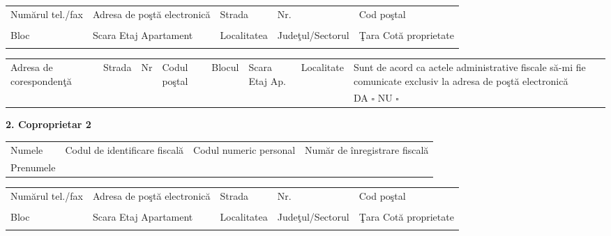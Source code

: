 \documentclass[10pt,a4paper,landscape]{article}
\newcommand{\fillline}[1][6cm]{\underline{\hspace{#1}}}
\newcommand{\checkboxempty}{$\square$}
\begin{document}
\begin{tabularx}{\textwidth}{|X|X|X|X|X|}
\hline
Numărul tel./fax & Adresa de poştă electronică & Strada & Nr. & Cod poştal \\
\fillline[3cm] & \fillline[4cm] & \fillline[4cm] & \fillline[1.5cm] & \fillline[2cm] \\
\hline
Bloc & Scara \quad Etaj \quad Apartament & Localitatea & Judeţul/Sectorul & Ţara \quad Cotă proprietate \\
\fillline[1.5cm] & \fillline[3cm] & \fillline[3cm] & \fillline[3cm] & \fillline[3cm] \\
\hline
\end{tabularx}

\begin{tabularx}{\textwidth}{|m{2.5cm}|X|X|X|X|X|X|m{4cm}|}
\hline
\multirow{2}{2.5cm}{Adresa de corespondenţă} & Strada & Nr & Codul poştal & Blocul & Scara \quad Etaj \quad Ap. & Localitate & Sunt de acord ca actele administrative fiscale să-mi fie comunicate exclusiv la adresa de poştă electronică \\
& \fillline[2cm] & \fillline[1cm] & \fillline[1.5cm] & \fillline[1cm] & \fillline[2cm] & \fillline[2cm] & DA \checkboxempty \hspace{0.5cm} NU \checkboxempty \\
\hline
\end{tabularx}

\vspace{0.3cm}

\textbf{2. Coproprietar 2}\\
\begin{tabularx}{\textwidth}{|X|X|X|X|}
\hline
Numele \fillline[5cm] & Codul de identificare fiscală & Codul numeric personal & Număr de înregistrare fiscală \\
Prenumele \fillline[5cm] & \fillline[4cm] & \fillline[4cm] & \fillline[4cm] \\
\hline
\end{tabularx}

\begin{tabularx}{\textwidth}{|X|X|X|X|X|}
\hline
Numărul tel./fax & Adresa de poştă electronică & Strada & Nr. & Cod poştal \\
\fillline[3cm] & \fillline[4cm] & \fillline[4cm] & \fillline[1.5cm] & \fillline[2cm] \\
\hline
Bloc & Scara \quad Etaj \quad Apartament & Localitatea & Judeţul/Sectorul & Ţara \quad Cotă proprietate \\
\fillline[1.5cm] & \fillline[3cm] & \fillline[3cm] & \fillline[3cm] & \fillline[3cm] \\
\hline
\end{tabularx}
\end{document}
